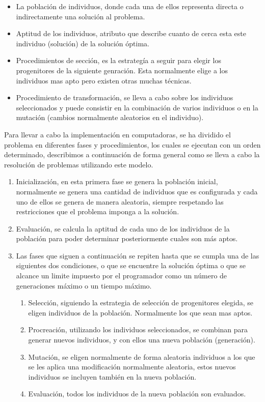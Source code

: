 \begin{itemize}
	\item La población de individuos, donde cada una de ellos representa directa o indirectamente una solución al problema.
	\item Aptitud de los individuos, atributo que describe cuanto de cerca esta este individuo (solución) de la solución \'optima. 
	\item Procedimientos de sección, es la estrateg\'ia a seguir para elegir los progenitores de la siguiente genraci\'on. Esta normalmente elige a los individuos mas apto pero existen otras muchas técnicas.
	\item Procedimiento de transformaci\'on, se lleva a cabo sobre los individuos seleccionados y puede consistir en la combinación de varios individuos o en la mutación (cambios normalmente aleatorios en el individuo).
\end{itemize}

Para llevar a cabo la implementación en computadoras, se ha dividido el problema en diferentes fases y procedimientos, los cuales se ejecutan con un orden determinado, describimos a continuación de forma general como se lleva a cabo la resolución de problemas utilizando este modelo.

\begin{enumerate}
	\item Inicializaci\'on, en esta primera fase se genera la población inicial, normalmente se genera una cantidad de individuos que es configurada y cada uno de ellos se genera de manera aleatoria, siempre respetando las restricciones que el problema imponga a la solución.
	\item Evaluaci\'on, se calcula la aptitud de cada uno de los individuos de la población para poder determinar posteriormente cuales son m\'as aptos.
	\item Las fases que siguen a continuación se repiten hasta que se cumpla una de las siguientes dos condiciones, o que se encuentre la solución \'optima o que se alcance un limite impuesto por el programador como un n\'umero de generaciones máximo o un tiempo máximo.
	\begin{enumerate}
		\item Selección, siguiendo la estrategia de selección de progenitores elegida, se eligen individuos de la población. Normalmente los que sean mas aptos.
		\item Procreaci\'on, utilizando los individuos seleccionados, se combinan para generar nuevos individuos, y con ellos una nueva población (generación).
		\item Mutaci\'on, se eligen normalmente de forma aleatoria individuos a los que se les aplica una modificación normalmente aleatoria, estos nuevos individuos se incluyen también en la nueva poblaci\'on.
		\item Evaluaci\'on, todos los individuos de la nueva poblaci\'on son evaluados.
	\end{enumerate}
\end{enumerate}

